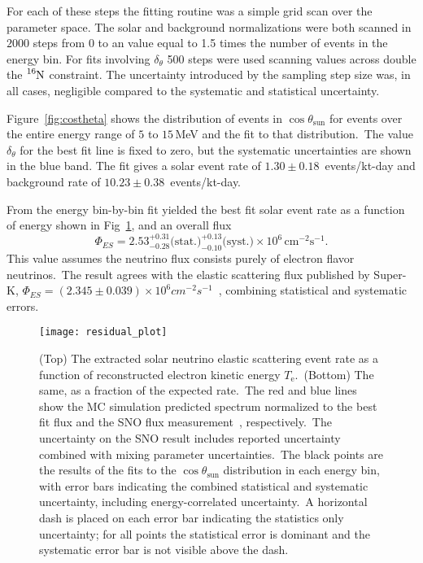 For each of these steps the fitting routine was a simple grid scan
over the parameter space. 
The solar and background normalizations were both scanned in $2000$ steps from 0 to
an  value equal to  1.5 times the number of events in the energy bin.
For fits involving $\delta_{\theta}$ 500 steps were used scanning values across
double the $\ce{^{16}N}$ constraint.
The uncertainty introduced by the sampling step size was, in all cases, negligible
compared to the systematic and statistical uncertainty.

Figure~\ref{fig:costheta} shows the distribution of events in $\cos\theta_\text{{sun}}$
for events over the entire energy range of $5$ to $15$\,MeV and the fit to that distribution.\
The value $\delta_\theta$ for the best fit line is fixed to zero, but the 
systematic uncertainties are shown in the blue band.
The fit gives a solar event rate of $1.30\pm0.18$~events/kt-day
 and background rate of  $10.23\pm0.38$~events/kt-day.

From the energy bin-by-bin fit  yielded the best fit solar event rate
as a function of energy shown in Fig~\ref{fig:spectrum}, and
an overall flux
\begin{equation*}
    \Phi_{ES}= 2.53^{+0.31}_{-0.28}\text{(stat.)}^{+0.13}_{-0.10}\text{(syst.)}\times10^6\,\text{cm}^{-2}\text{s}^{-1}\text{.}
\end{equation*}
This value assumes the neutrino flux consists purely of electron flavor neutrinos.\
The result agrees with the elastic scattering flux published by Super-K,
$\Phi_{ES}=\left(2.345\pm0.039\right)\times10^{6}cm^{-2}s^{-1}$~\citep{superk4},
combining statistical and systematic errors.

\begin{figure}
  \centering
  \texttt{[image: residual\_plot]}
  \caption[Solar Spectrum Data to MC Comparison]{
    (Top) The extracted solar neutrino elastic scattering event rate as a
    function of reconstructed electron kinetic energy $T_{\mathrm{e}}$.\
    (Bottom) The same, as a fraction of the expected rate.\
    The red and blue lines show the MC simulation predicted spectrum normalized
    to the best fit flux and the SNO flux measurement~\citep{sno_combined}, respectively.\
    The uncertainty on the SNO result includes reported uncertainty combined with
    mixing parameter uncertainties.\
    The black points are the results of the fits to the $\cos\theta_\text{{sun}}$
    distribution in each energy bin,
    with error bars indicating the combined statistical and systematic
    uncertainty, including energy-correlated uncertainty.\
    A horizontal dash is placed on each error bar indicating the statistics
    only uncertainty; for all points the statistical error is dominant and the systematic
    error bar is not visible above the dash.}
  \label{fig:spectrum}
\end{figure}

